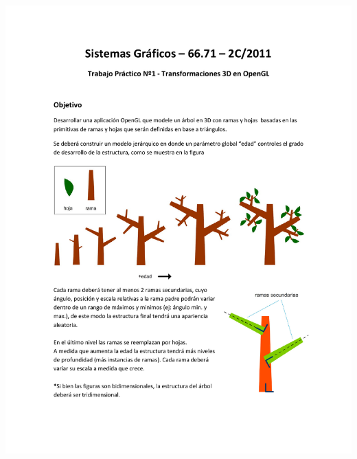 \documentclass[11pt]{article}
\begin{document}
\begin{center}
\includegraphics[trim = 25mm 30mm 10mm 35mm, clip,height=0.93\textheight,width=1.04\textwidth]{tp1-c2-2011.pdf}

\end{center}
\end{document}
